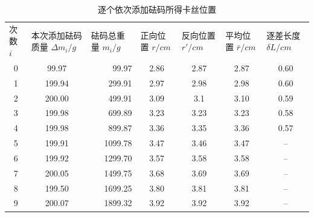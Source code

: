 \documentclass{ctexart}
\begin{document}
\begin{table}[H]
  \centering
  \caption{逐个依次添加砝码所得卡丝位置}
  \resizebox{\textwidth}{!}
  {
    \begin{tabular}{ccrcccc}
    \multicolumn{1}{l}{次数 $i$} & \multicolumn{1}{l}{本次添加砝码质量 $\Delta m_i /g$} & \multicolumn{1}{l}{砝码总重量 $m_i /g$} & \multicolumn{1}{l}{正向位置 $r/cm$} & \multicolumn{1}{l}{反向位置 $r'/cm$} & \multicolumn{1}{l}{平均位置 $\bar{r}/cm$} & \multicolumn{1}{l}{逐差长度 $\delta L/cm$} \\
    0     & 99.97 & 99.97 & 2.86  & 2.87  & 2.87  & 0.60  \\
    1     & 199.94 & 299.91  & 2.97  & 2.98  & 2.98  & 0.60  \\
    2     & 200.00 & 499.91  & 3.09  & 3.1   & 3.10  & 0.59  \\
    3     & 199.98 & 699.89  & 3.23  & 3.23  & 3.23  & 0.58  \\
    4     & 199.98 & 899.87  & 3.36  & 3.35  & 3.36  & 0.57  \\
    5     & 199.91 & 1099.78  & 3.47  & 3.46  & 3.47  & -- \\
    6     & 199.92 & 1299.70  & 3.57  & 3.58  & 3.58  & -- \\
    7     & 200.05 & 1499.75  & 3.68  & 3.69  & 3.69  & -- \\
    8     & 199.50 & 1699.25  & 3.80  & 3.81  & 3.81  & -- \\
    9     & 200.07 & 1899.32  & 3.92  & 3.92  & 3.92  & -- \\
    \end{tabular}%
  }
  \label{tab:addlabel}%
\end{table}%
\end{document}
